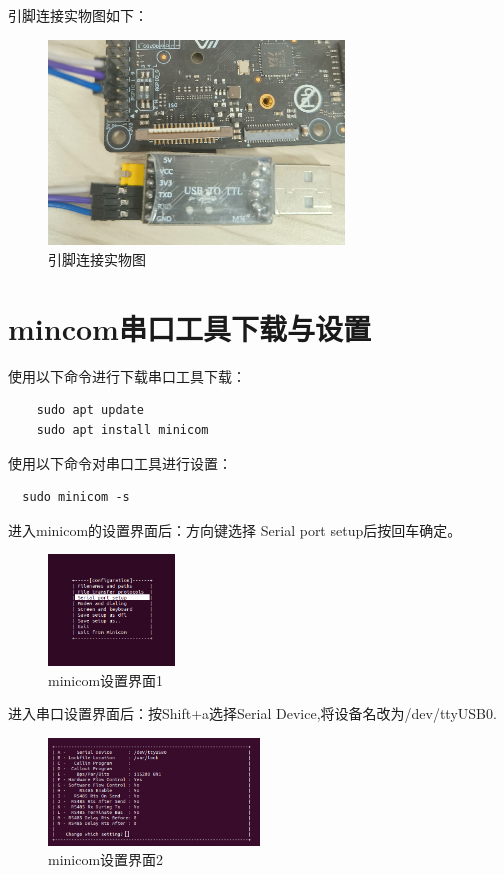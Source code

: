 \documentclass[lang=cn,10pt]{elegantbook}
\begin{document}
引脚连接实物图如下：

\begin{figure}[htbp]
  \centering
  \includegraphics[width=0.7\textwidth]{image/image-20231029115801584.png}
  \caption{引脚连接实物图}
\end{figure}

\newpage
\section{mincom串口工具下载与设置}

使用以下命令进行下载串口工具下载：
\begin{lstlisting}
    sudo apt update
    sudo apt install minicom
\end{lstlisting}

使用以下命令对串口工具进行设置：
\begin{lstlisting}
  sudo minicom -s  
\end{lstlisting}

进入minicom的设置界面后：方向键选择 Serial port setup后按回车确定。

\begin{figure}[htbp]
  \centering
  \includegraphics[width=0.3\textwidth]{image/image-20231029120122847.png}
  \caption{minicom设置界面1}
\end{figure}

进入串口设置界面后：按Shift+a选择Serial Device,将设备名改为/dev/ttyUSB0.

\begin{figure}[htbp]
  \centering
  \includegraphics[width=0.5\textwidth]{image/image-20231029120332044.png}
  \caption{minicom设置界面2}
\end{figure}
\end{document}
